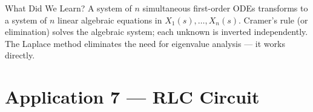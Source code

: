 \documentclass[12pt,a4paper]{article}
\begin{document}
\begin{learnbox}{What Did We Learn?}
A system of $n$ simultaneous first-order ODEs transforms to a system of $n$ linear
algebraic equations in $X_1(s),\ldots,X_n(s)$. Cramer's rule (or elimination) solves
the algebraic system; each unknown is inverted independently. The Laplace method
eliminates the need for eigenvalue analysis --- it works directly.
\end{learnbox}

\section{Application 7 --- RLC Circuit}
\end{document}
